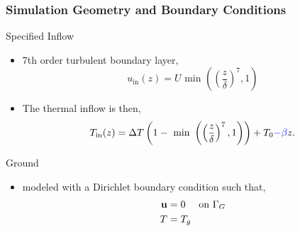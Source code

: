 \documentclass[mathserif]{beamer}
\begin{document}
%
%
%
\begin{frame}
\frametitle{Simulation Geometry and Boundary Conditions}

\begin{block}{Specified Inflow}

   \begin{itemize}
   \item 7th order turbulent boundary layer, 
     \begin{equation*}
       u_{\text{in}}(z) = U \text{ min }\left(\left(\frac{z}{\delta}\right)^7,1\right)
       \label{eq:bl_u}
     \end{equation*}
   \item The thermal inflow is then,
     \begin{equation*}
       T_{\text{in}}(z) = \Delta T \left(1- \text{ min
       }\left(\left(\frac{z}{\delta}\right)^7,1\right)\right)
       + T_0 \textcolor{blue}{- \beta}z.  
     \end{equation*}
   \end{itemize}
\end{block}

\begin{block}{Ground}
  \begin{itemize}
    \item modeled with a Dirichlet boundary condition such that, 
      \begin{align*}
        {\bf u} &= 0 \quad \text{ on } \Gamma_G \\
        T &= T_g
      \end{align*}
  \end{itemize}
  \end{block}

\end{frame}
\end{document}
